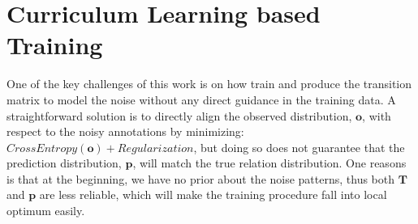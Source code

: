 \section{Curriculum Learning based Training \label{sec:training}}  

One of the key challenges of this work is  on how train and produce the transition matrix to model the noise without any direct guidance in the training data. 
A straightforward solution is to directly align the observed distribution, $\mathbf{o}$, with respect to the noisy annotations by minimizing:
$CrossEntropy(\mathbf{o}) + Regularization$, but doing so 
%
does not guarantee that the prediction distribution, $\mathbf{p}$, will match the true relation distribution.
One reasons is that at the beginning, we have no prior about the noise patterns, thus both  $\mathbf{T}$ and $\mathbf{p}$ are less reliable, which will make the training procedure fall into local optimum easily.  

%

